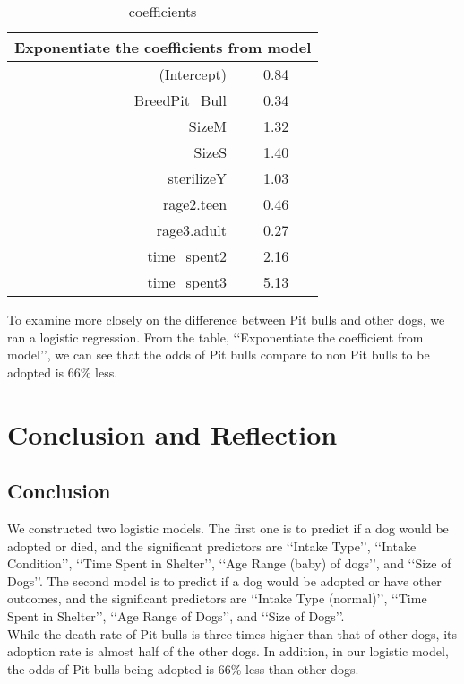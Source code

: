\documentclass[12pt]{article}
\begin{document}
\begin{flushleft}
\begin{table}[H]
\centering
\caption{coefficients}
\begin{tabular}{|r c| }\hline
\multicolumn {2}{|c|}{Exponentiate the coefficients from model} \\\hline
(Intercept)&0.84\\
BreedPit\_Bull&0.34\\
SizeM&1.32\\
SizeS&1.40\\
sterilizeY&1.03\\
rage2.teen&0.46\\
rage3.adult&0.27\\
time\_spent2&2.16\\
time\_spent3&5.13\\ \hline
\end{tabular}
\end{table}

To examine more closely on the difference between Pit bulls and other dogs, we ran a logistic regression. From the table, \lq\lq Exponentiate the coefficient from model\rq\rq, we can see that the odds of Pit bulls compare to non Pit bulls to be adopted is 66\% less.\\
\bigskip
\section{Conclusion and Reflection}
\subsection{Conclusion}
We constructed two logistic models. The first one is to predict if a dog would be adopted or died, and the significant predictors are \lq\lq Intake Type\rq\rq, \lq\lq Intake Condition\rq\rq, \lq\lq Time Spent in Shelter\rq\rq, \lq\lq Age Range (baby) of dogs\rq\rq, and \lq\lq Size of Dogs\rq\rq. The second model is to predict if a dog would be adopted or have other outcomes, and the significant predictors are \lq\lq Intake Type (normal)\rq\rq, \lq\lq Time Spent in Shelter\rq\rq, \lq\lq Age Range of Dogs\rq\rq, and \lq\lq Size of Dogs\rq\rq.\\
While the death rate of Pit bulls is three times higher than that of other dogs, its adoption rate is almost half of the other dogs. In addition, in our logistic model, the odds of Pit bulls being adopted is 66\% less than other dogs.\\
\bigskip

\end{flushleft}
\end{document}
